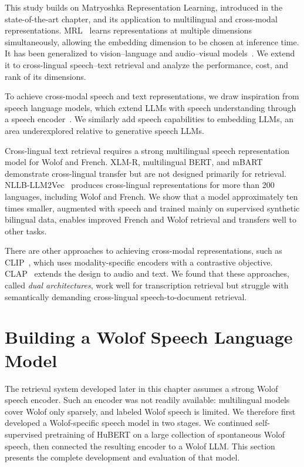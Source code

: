 This study builds on Matryoshka Representation Learning, introduced in the state-of-the-art chapter, and its application to multilingual and cross-modal representations.
MRL~\citep{MRL} learns representations at multiple dimensions simultaneously, allowing the embedding dimension to be chosen at inference time. It has been generalized to vision--language and audio--visual models~\citep{hu2024matryoshkaquerytransformerlarge,cai2024matryoshkamultimodalmodels,cappellazzo2025adaptiveaudiovisualspeechrecognition}. We extend it to cross-lingual speech--text retrieval and analyze the performance, cost, and rank of its dimensions.

To achieve cross-modal speech and text representations, we draw inspiration from speech language models, which extend LLMs with speech understanding through a speech encoder~\citep{llamaspeech,pareras2025revisitingdirectspeechtotexttranslation,slm_methods}. We similarly add speech capabilities to embedding LLMs, an area underexplored relative to generative speech LLMs.

Cross-lingual text retrieval requires a strong multilingual speech representation model for Wolof and French.
XLM-R, multilingual BERT, and mBART~\citep{xlmr,mbert,mbart} demonstrate cross-lingual transfer but are not designed primarily for retrieval. 
NLLB-LLM2Vec~\citep{nllbllm2vec} produces cross-lingual representations for more than 200 languages, including Wolof and French.
We show that a model approximately ten times smaller, augmented with speech and trained mainly on supervised synthetic bilingual data, 
enables improved French and Wolof retrieval and transfers well to other tasks.

There are other approaches to achieving cross-modal representations,
such as CLIP~\citep{clip}, which uses modality-specific encoders with a contrastive objective. 
CLAP~\citep{clap} extends the design to audio and text.
We found that these approaches, called \textit{dual architectures}, work well for transcription retrieval but struggle with semantically demanding cross-lingual speech-to-document retrieval.

\section{Building a Wolof Speech Language Model}
\label{sec:wolof-speech-lm}

The retrieval system developed later in this chapter assumes a strong Wolof speech encoder. Such an encoder was not readily available: multilingual models cover Wolof only sparsely, and labeled Wolof speech is limited. We therefore first developed a Wolof-specific speech model in two stages. We continued self-supervised pretraining of HuBERT on a large collection of spontaneous Wolof speech, then connected the resulting encoder to a Wolof LLM. This section presents the complete development and evaluation of that model.

